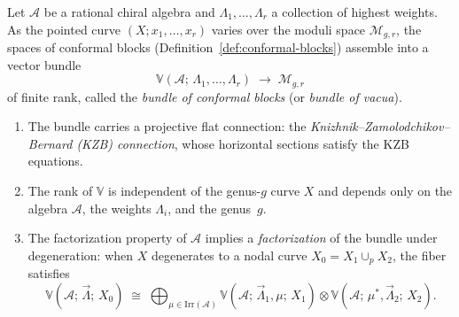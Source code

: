 \begin{definition}
\label{def:bundle-conformal-blocks}
Let $\mathcal{A}$ be a rational chiral algebra and
$\Lambda_1, \ldots, \Lambda_r$ a collection of highest weights.
As the pointed curve $(X; x_1, \ldots, x_r)$ varies over the moduli
space $\mathcal{M}_{g,r}$, the spaces of conformal blocks
(Definition~\ref{def:conformal-blocks}) assemble into a vector bundle
\begin{equation}\label{eq:conformal-block-bundle}
\mathbb{V}(\mathcal{A};\, \Lambda_1, \ldots, \Lambda_r)
\;\to\; \mathcal{M}_{g,r}
\end{equation}
of finite rank, called the \emph{bundle of conformal blocks} (or
\emph{bundle of vacua}).
\begin{enumerate}[label=\textup{(\roman*)}]
\item The bundle carries a projective flat connection: the
 \emph{Knizhnik--Zamolodchikov--Bernard (KZB) connection},
 whose horizontal sections satisfy the KZB equations.
\item The rank of $\mathbb{V}$ is independent of the genus-$g$
 curve $X$ and depends only on the algebra $\mathcal{A}$, the
 weights $\Lambda_i$, and the genus~$g$.
\item The factorization property of $\mathcal{A}$ implies a
 \emph{factorization} of the bundle under degeneration: when $X$
 degenerates to a nodal curve $X_0 = X_1 \cup_p X_2$, the fiber
 satisfies
 \[
 \mathbb{V}(\mathcal{A};\, \vec{\Lambda};\, X_0)
 \;\cong\;
 \bigoplus_{\mu \in \mathrm{Irr}(\mathcal{A})}
 \mathbb{V}(\mathcal{A};\, \vec{\Lambda}_1, \mu;\, X_1)
 \otimes
 \mathbb{V}(\mathcal{A};\, \mu^*, \vec{\Lambda}_2;\, X_2).
 \]
\end{enumerate}
\end{definition}

